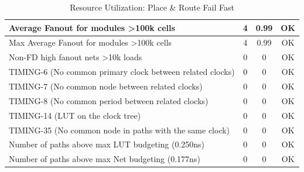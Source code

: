 \documentclass{article}
\begin{document}
\begin{table}[H]
\begin{tabular}{|l|c|c|c|}
    Average Fanout for modules \textgreater 100k cells               & 4                  & 0.99                 & OK              \\ \hline
    Max Average Fanout for modules \textgreater 100k cells           & 4                  & 0.99                 & OK              \\ \hline
    Non-FD high fanout nets \textgreater 10k loads                   & 0                  & 0                    & OK              \\ \hline
    TIMING-6 (No common primary clock between related clocks)         & 0                  & 0                    & OK              \\ \hline
    TIMING-7 (No common node between related clocks)                  & 0                  & 0                    & OK              \\ \hline
    TIMING-8 (No common period between related clocks)                & 0                  & 0                    & OK              \\ \hline
    TIMING-14 (LUT on the clock tree)                                 & 0                  & 0                    & OK              \\ \hline
    TIMING-35 (No common node in paths with the same clock)           & 0                  & 0                    & OK              \\ \hline
    Number of paths above max LUT budgeting (0.250ns)                 & 0                  & 0                    & OK              \\ \hline
    Number of paths above max Net budgeting (0.177ns)                 & 0                  & 0                    & OK              \\ \hline
    \end{tabular}
    \caption{Resource Utilization: Place \& Route Fail Fast}
\end{table}
\end{document}

